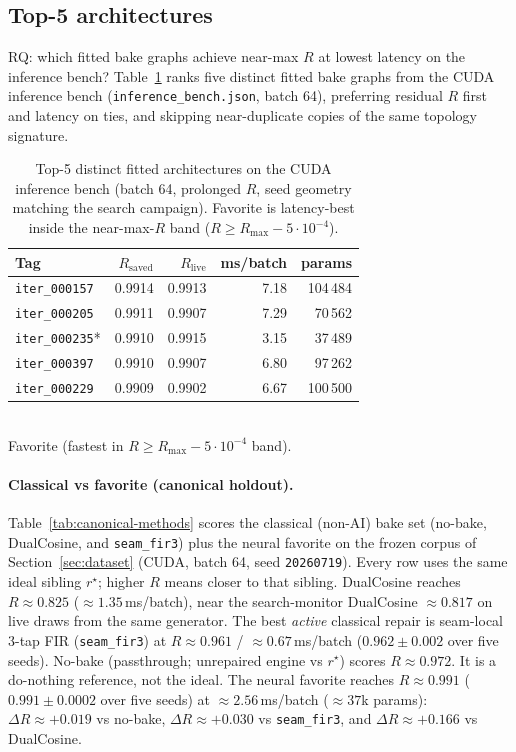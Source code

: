 \subsection{Top-5 architectures}
\label{sec:top5-arch}
RQ: which fitted bake graphs achieve near-max $R$ at lowest latency on the inference bench?
Table~\ref{tab:top5} ranks five distinct fitted bake graphs from the CUDA inference bench
(\texttt{inference\_bench.json}, batch 64), preferring residual $R$ first and latency on ties,
and skipping near-duplicate copies of the same topology signature.

\begin{table}[t]
  \centering
  \caption{Top-5 distinct fitted architectures on the CUDA inference bench (batch 64, prolonged $R$, seed geometry matching the search campaign). Favorite is latency-best inside the near-max-$R$ band ($R\ge R_{\max}-5\cdot10^{-4}$).}
  \label{tab:top5}
  \setlength{\tabcolsep}{3pt}
  \begin{tabular}{@{}lrrrr@{}}
    \toprule
    Tag & $R_{\mathrm{saved}}$ & $R_{\mathrm{live}}$ & ms/batch & params \\
    \midrule
    \texttt{iter\_000157} & 0.9914 & 0.9913 & 7.18 & 104\,484 \\
    \texttt{iter\_000205} & 0.9911 & 0.9907 & 7.29 & 70\,562 \\
    \texttt{iter\_000235}* & 0.9910 & 0.9915 & 3.15 & 37\,489 \\
    \texttt{iter\_000397} & 0.9910 & 0.9907 & 6.80 & 97\,262 \\
    \texttt{iter\_000229} & 0.9909 & 0.9902 & 6.67 & 100\,500 \\
    \bottomrule
  \end{tabular}\\[0.4em]
  {\footnotesize *Favorite (fastest in $R\ge R_{\max}-5\cdot10^{-4}$ band).}
\end{table}

\paragraph{Classical vs favorite (canonical holdout).}
Table~\ref{tab:canonical-methods} scores the classical (non-AI) bake set (no-bake, DualCosine, and \texttt{seam\_fir3}) plus the neural favorite on the frozen corpus of Section~\ref{sec:dataset} (CUDA, batch 64, seed \texttt{20260719}).
Every row uses the same ideal sibling $r^{\star}$; higher $R$ means closer to that sibling.
DualCosine reaches $R\approx 0.825$ ($\approx 1.35$\,ms/batch), near the search-monitor DualCosine $\approx 0.817$ on live draws from the same generator.
The best \emph{active} classical repair is seam-local 3-tap FIR (\texttt{seam\_fir3}) at $R\approx 0.961$ / $\approx 0.67$\,ms/batch ($0.962\pm0.002$ over five seeds).
No-bake (passthrough; unrepaired engine vs $r^{\star}$) scores $R\approx 0.972$.
It is a do-nothing reference, not the ideal.
The neural favorite reaches $R\approx 0.991$ ($0.991\pm0.0002$ over five seeds) at $\approx 2.56$\,ms/batch ($\approx 37$k params):
$\Delta R \approx {+}0.019$ vs no-bake, $\Delta R \approx {+}0.030$ vs \texttt{seam\_fir3}, and $\Delta R \approx {+}0.166$ vs DualCosine.

